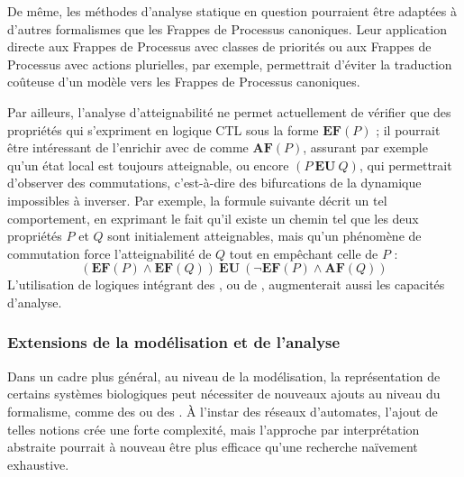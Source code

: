 De même, les méthodes d'analyse statique en question pourraient être adaptées
à d'autres formalismes que les Frappes de Processus canoniques.
Leur application directe aux
Frappes de Processus avec classes de priorités ou aux Frappes de Processus avec actions
plurielles, par exemple,
permettrait d'éviter la traduction coûteuse d'un modèle vers les Frappes de Processus canoniques.

Par ailleurs, l'analyse d'atteignabilité ne permet actuellement de vérifier que des propriétés
qui s'expriment en logique CTL sous la forme $\mathbf{EF}(P)$ ;
il pourrait être intéressant de l'enrichir avec de  comme
$\mathbf{AF}(P)$, assurant par exemple qu'un état local est toujours atteignable,
ou encore $(P\:\mathbf{EU}\:Q)$, qui permettrait d'observer des commutations,
c'est-à-dire des bifurcations de la dynamique impossibles à inverser.
Par exemple, la formule suivante décrit un tel comportement,
en exprimant le fait qu'il existe un chemin tel que les deux propriétés $P$ et $Q$ sont
initialement atteignables, mais qu'un phénomène de commutation force l'atteignabilité de $Q$
tout en empêchant celle de $P$ :
\[(\mathbf{EF}(P) \wedge \mathbf{EF}(Q))\:\mathbf{EU}\:(\neg\mathbf{EF}(P) \wedge \mathbf{AF}(Q))\]
L'utilisation de logiques intégrant des ,
ou de ,
augmenterait aussi les capacités d'analyse.




\subsubsection*{Extensions de la modélisation et de l'analyse}

Dans un cadre plus général, au niveau de la modélisation,
la représentation de certains systèmes biologiques peut nécessiter de nouveaux ajouts au niveau du
formalisme,
comme des  ou des .
À l'instar des réseaux d'automates, l'ajout de telles notions crée une forte complexité,
mais l'approche par interprétation abstraite pourrait à nouveau être plus efficace
qu'une recherche naïvement exhaustive.

